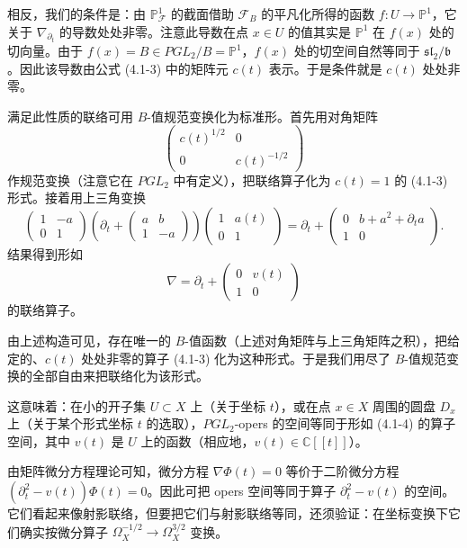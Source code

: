 相反，我们的条件是：由 $\mathbb{P}^1_{\mathcal{F}}$ 的截面借助 $\mathcal{F}_B$ 的平凡化所得的函数 $f:U\to\mathbb{P}^1$，它关于 $\nabla_{\partial_t}$ 的导数处处非零。注意此导数在点 $x\in U$ 的值其实是 $\mathbb{P}^1$ 在 $f(x)$ 处的切向量。由于 $f(x)=B\in PGL_2/B=\mathbb{P}^1$，$f(x)$ 处的切空间自然等同于 $\mathfrak{sl}_2/\mathfrak{b}$。因此该导数由公式 (4.1-3) 中的矩阵元 $c(t)$ 表示。于是条件就是 $c(t)$ 处处非零。

满足此性质的联络可用 $B$-值规范变换化为标准形。首先用对角矩阵
\[
    \begin{pmatrix}c(t)^{1/2}&0\\0&c(t)^{-1/2}\end{pmatrix}
\]
作规范变换（注意它在 $PGL_2$ 中有定义），把联络算子化为 $c(t)=1$ 的 (4.1-3) 形式。接着用上三角变换
\[
    \begin{pmatrix}1&-a\\0&1\end{pmatrix}\left(\partial_t+\begin{pmatrix}a&b\\1&-a\end{pmatrix}\right)\begin{pmatrix}1&a(t)\\0&1\end{pmatrix}
    =\partial_t+\begin{pmatrix}0&b+a^2+\partial_t a\\1&0\end{pmatrix}.
\]
结果得到形如
\begin{equation}
    \nabla=\partial_t+\begin{pmatrix}0&v(t)\\1&0\end{pmatrix}
    \tag{4.1-4}
\end{equation}
的联络算子。

由上述构造可见，存在唯一的 $B$-值函数（上述对角矩阵与上三角矩阵之积），把给定的、$c(t)$ 处处非零的算子 (4.1-3) 化为这种形式。于是我们用尽了 $B$-值规范变换的全部自由来把联络化为该形式。

这意味着：在小的开子集 $U\subset X$ 上（关于坐标 $t$），或在点 $x\in X$ 周围的圆盘 $D_x$ 上（关于某个形式坐标 $t$ 的选取），$PGL_2$-opers 的空间等同于形如 (4.1-4) 的算子空间，其中 $v(t)$ 是 $U$ 上的函数（相应地，$v(t)\in\mathbb{C}[[t]]$）。

由矩阵微分方程理论可知，微分方程 $\nabla\Phi(t)=0$ 等价于二阶微分方程 $(\partial_t^2-v(t))\Phi(t)=0$。因此可把 opers 空间等同于算子 $\partial_t^2-v(t)$ 的空间。它们看起来像射影联络，但要把它们与射影联络等同，还须验证：在坐标变换下它们确实按微分算子 $\Omega_X^{-1/2}\to\Omega_X^{3/2}$ 变换。

